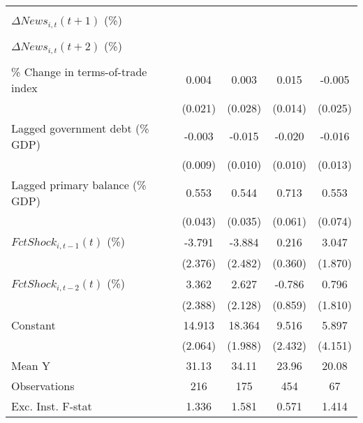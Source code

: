 {\begin{tabular}{l*{4}{c}}
                    &                     &                     &                     &                     \\
\addlinespace
$ \Delta News_{i,t}(t+1)$ (\%)&                     &                     &                     &                     \\
                    &                     &                     &                     &                     \\
\addlinespace
$ \Delta News_{i,t}(t+2)$ (\%)&                     &                     &                     &                     \\
                    &                     &                     &                     &                     \\
\addlinespace
\% Change in terms-of-trade index&       0.004         &       0.003         &       0.015         &      -0.005         \\
                    &     (0.021)         &     (0.028)         &     (0.014)         &     (0.025)         \\
\addlinespace
Lagged government debt (\% GDP)&      -0.003         &      -0.015         &      -0.020\sym{**} &      -0.016         \\
                    &     (0.009)         &     (0.010)         &     (0.010)         &     (0.013)         \\
\addlinespace
Lagged primary balance (\% GDP)&       0.553\sym{***}&       0.544\sym{***}&       0.713\sym{***}&       0.553\sym{***}\\
                    &     (0.043)         &     (0.035)         &     (0.061)         &     (0.074)         \\
\addlinespace
$ FctShock_{i,t-1}(t)$ (\%)&      -3.791         &      -3.884         &       0.216         &       3.047         \\
                    &     (2.376)         &     (2.482)         &     (0.360)         &     (1.870)         \\
\addlinespace
$ FctShock_{i,t-2}(t)$ (\%)&       3.362         &       2.627         &      -0.786         &       0.796         \\
                    &     (2.388)         &     (2.128)         &     (0.859)         &     (1.810)         \\
\addlinespace
Constant            &      14.913\sym{***}&      18.364\sym{***}&       9.516\sym{***}&       5.897         \\
                    &     (2.064)         &     (1.988)         &     (2.432)         &     (4.151)         \\
\midrule
Mean Y              &       31.13         &       34.11         &       23.96         &       20.08         \\
Observations        &         216         &         175         &         454         &          67         \\
Exc. Inst. F-stat   &       1.336         &       1.581         &       0.571         &       1.414         \\
\bottomrule
\end{tabular}
}
